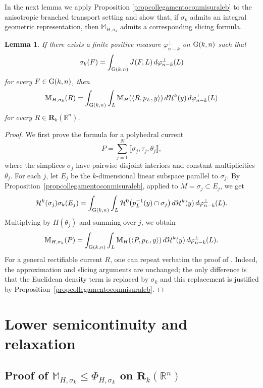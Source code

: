 \documentclass{article}
\numberwithin{equation}{section}
\theoremstyle{plain}%
\newtheorem{lemma}[theorem]{Lemma}
\theoremstyle{definition}
\theoremstyle{definition}
\newcommand{\rgrande}{\mathbb{R}}
\newcommand{\haus}{\mathcal{H}}
\newcommand{\corrett}{\mathbf{R}_k(\rgrande^n)}
\newcommand{\massa}{\mathbb{M}}
\newcommand{\massaanisotropa}{\mathbb{M}_{H,\sigma_k}}
\newcommand{\grass}{{\rm G}}
\newcommand{\grasskn}{\grass(k,n)}
\newcommand{\slice}[3]{\langle{#1} , {#2}, {#3} \rangle}
\begin{document}
In the next lemma we apply Proposition \ref{propcollegamentoconmisuraleb} to the anisotropic branched transport setting and show that, if $\sigma_k$ admits an integral geometric representation, then $\massaanisotropa$ admits a corresponding slicing formula.
\begin{lemma}\label{lemmaigpermasssaanisotropa}
     If there exists a finite positive measure $\varphi_{n-k}^{\perp}$ on $\grasskn$ such that
    \begin{equation*}
        \sigma_k (F) = \int_{\grasskn} J(F,L)\, d \varphi_{n-k}^{\perp} (L)
    \end{equation*}
    for every $F \in \grasskn$, then
    \begin{equation*}
        \massaanisotropa(R) = \int_{\grasskn} {
        \int_{L} {
        \massa_H (\slice{R}{p_L}{y})
        }
        \, d \haus^k (y)
        } \, d \varphi_{n-k}^{\perp} (L)
    \end{equation*}
    for every $R \in \corrett$.
\end{lemma}
\begin{proof}
We first prove the formula for a polyhedral current
$$
P=\sum_{j=1}^N \llbracket \sigma_j,\tau_j,\theta_j\rrbracket,
$$
where the simplices $\sigma_j$ have pairwise disjoint interiors and constant multiplicities $\theta_j$.
For each $j$, let $E_j$ be the $k$-dimensional linear subspace parallel to $\sigma_j$. By Proposition~\ref{propcollegamentoconmisuraleb}, applied to $M=\sigma_j\subset E_j$, we get
$$
\haus^k(\sigma_j)\sigma_k(E_j)
=
\int_{\grasskn}\int_L \haus^0\bigl(p_L^{-1}(y)\cap \sigma_j\bigr)\,d\haus^k(y)\,d\varphi_{n-k}^{\perp}(L).
$$
Multiplying by $H(\theta_j)$ and summing over $j$, we obtain
$$
\massaanisotropa(P)
=
\int_{\grasskn}\int_L \massa_H(\slice{P}{p_L}{y})\,d\haus^k(y)\,d\varphi_{n-k}^{\perp}(L).
$$
For a general rectifiable current $R$, one can repeat verbatim the proof of \cite[Lemma 3.1]{cdrms17}. Indeed, the approximation and slicing arguments are unchanged; the only difference is that the Euclidean density term is replaced by $\sigma_k$ and this replacement is justified by Proposition~\ref{propcollegamentoconmisuraleb}.
\end{proof}

\section{Lower semicontinuity and relaxation}\label{sec:lscrel}
\subsection{Proof of $\massaanisotropa \leq \Phi_{H,\sigma_k}$ on $\corrett$}
\end{document}
